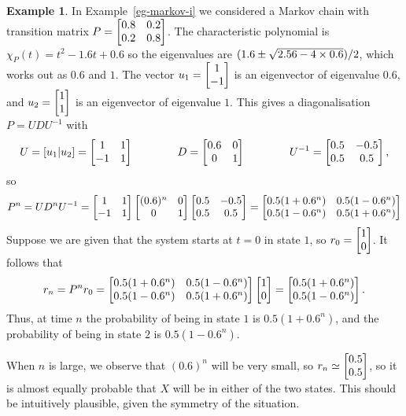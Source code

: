 \documentclass[reqno]{amsart}
\theoremstyle{definition}
\newtheorem{example}[theorem]{Example}
\begin{document}
\begin{example}\label{eg-markov-i-again}
 In Example~\ref{eg-markov-i} we considered a Markov chain with
 transition matrix $P=\left[\begin{matrix} 0.8 & 0.2\\ 0.2 & 0.8 \end{matrix}\right]$.  The
 characteristic polynomial is $\chi_P(t)=t^2-1.6t+0.6$ so the
 eigenvalues are $(1.6\pm\sqrt{2.56-4\times 0.6})/2$, which works out as
 $0.6$ and $1$.  The vector $u_1=\left[\begin{matrix} 1\\ -1\end{matrix}\right]$ is an eigenvector of
 eigenvalue $0.6$, and $u_2=\left[\begin{matrix} 1\\ 1\end{matrix}\right]$ is an eigenvector of
 eigenvalue $1$.  This gives a diagonalisation $P=UDU^{-1}$ with 
 \[ U = [u_1|u_2] = \left[\begin{matrix} 1&1\\-1&1 \end{matrix}\right] \hspace{4em}
    D = \left[\begin{matrix} 0.6 & 0 \\ 0 & 1 \end{matrix}\right] \hspace{4em}
    U^{-1} = \left[\begin{matrix} 0.5&-0.5 \\ 0.5&0.5 \end{matrix}\right], 
 \]
 so 
 \[ P^n = UD^nU^{-1} = 
     \left[\begin{matrix} 1&1\\-1&1 \end{matrix}\right] 
     \left[\begin{matrix} (0.6)^n & 0 \\ 0 & 1 \end{matrix}\right] 
     \left[\begin{matrix} 0.5&-0.5 \\ 0.5&0.5 \end{matrix}\right] = 
     \left[\begin{matrix} 0.5(1+0.6^n) &  0.5(1-0.6^n) \\  
          0.5(1-0.6^n) &  0.5(1+0.6^n) \end{matrix}\right]  
 \]
 Suppose we are given that the system starts at $t=0$ in state $1$, so
 $r_0=\left[\begin{matrix} 1\\ 0\end{matrix}\right]$.  It follows that
 \[ r_n =
    P^n r_0 =
    \left[\begin{matrix} 0.5(1+0.6^n) &  0.5(1-0.6^n) \\  
         0.5(1-0.6^n) &  0.5(1+0.6^n) \end{matrix}\right]
    \left[\begin{matrix} 1 \\ 0 \end{matrix}\right] =
    \left[\begin{matrix} 0.5(1+0.6^n) \\
         0.5(1-0.6^n) \end{matrix}\right].
 \]
 Thus, at time $n$ the probability of being in state $1$ is
 $0.5(1+0.6^n)$, and the probability of being in state $2$ is
 $0.5(1-0.6^n)$. 

 When $n$ is large, we observe that $(0.6)^n$ will be very small, so
 $r_n\simeq\left[\begin{matrix} 0.5\\0.5\end{matrix}\right]$, so it is almost equally probable that
 $X$ will be in either of the two states.  This should be intuitively
 plausible, given the symmetry of the situation.
\end{example}
\end{document}
